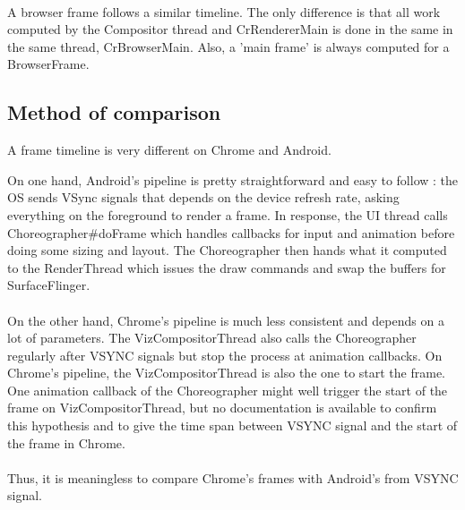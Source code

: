 \documentclass{kththesis}
\begin{document}
\paragraph{}
A browser frame follows a similar timeline. The only difference is that all work computed by the Compositor thread and CrRendererMain is done in the same in the same thread, CrBrowserMain. Also, a 'main frame' is always computed for a BrowserFrame. 

    \subsection{Method of comparison}

A frame timeline is very different on Chrome and Android.

On one hand, Android's pipeline is pretty straightforward and easy to follow : the OS sends VSync signals that depends on the device refresh rate, asking everything on the foreground to render a frame. In response, the UI thread calls Choreographer\#doFrame which handles callbacks for input and animation before doing some sizing and layout. The Choreographer then hands what it computed to the RenderThread which issues the draw commands and swap the buffers for SurfaceFlinger.

\paragraph{}
On the other hand, Chrome's pipeline is much less consistent and depends on a lot of parameters. The VizCompositorThread also calls the Choreographer regularly after VSYNC signals but stop the process at animation callbacks. On Chrome's pipeline, the VizCompositorThread is also the one to start the frame. One animation callback of the Choreographer might well trigger the start of the frame on VizCompositorThread, but no documentation is available to confirm this hypothesis and to give the time span between VSYNC signal and the start of the frame in Chrome.

\paragraph{}
Thus, it is meaningless to compare Chrome's frames with Android's from VSYNC signal.
\end{document}
